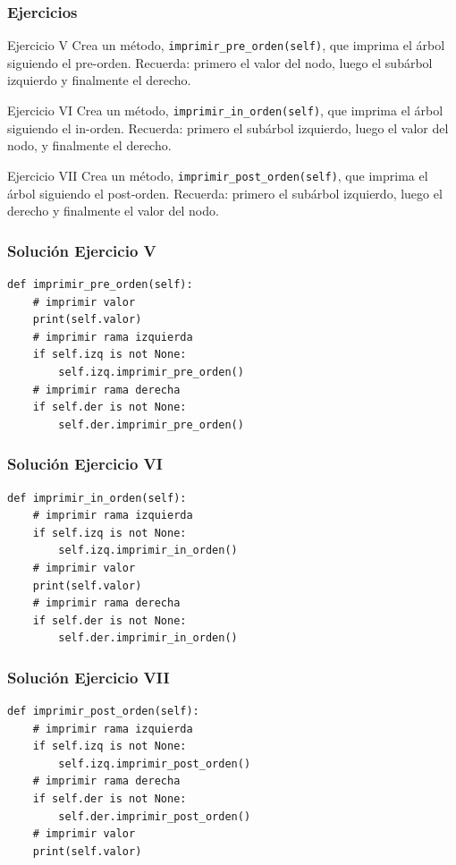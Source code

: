 \documentclass[11pt]{beamer}
\begin{document}
	\begin{frame}\frametitle{Ejercicios}
	\begin{block}{Ejercicio V}
	Crea un método, \lstinline|imprimir_pre_orden(self)|, que imprima el árbol siguiendo el pre-orden. Recuerda: primero el valor del nodo, luego el subárbol izquierdo y finalmente el derecho.
	\end{block}
	\begin{block}{Ejercicio VI}
	Crea un método, \lstinline|imprimir_in_orden(self)|, que imprima el árbol siguiendo el in-orden. Recuerda: primero el subárbol izquierdo, luego el valor del nodo, y finalmente el derecho.
	\end{block}
	\begin{block}{Ejercicio VII}
	Crea un método, \lstinline|imprimir_post_orden(self)|, que imprima el árbol siguiendo el post-orden. Recuerda: primero el subárbol izquierdo, luego el derecho y finalmente el valor del nodo.
	\end{block}
	\end{frame}

	\begin{frame}[fragile]\frametitle{Solución Ejercicio V}
	\begin{lstlisting}
def imprimir_pre_orden(self):
    # imprimir valor
    print(self.valor)
    # imprimir rama izquierda
    if self.izq is not None:
        self.izq.imprimir_pre_orden()
    # imprimir rama derecha
    if self.der is not None:
        self.der.imprimir_pre_orden()
\end{lstlisting}
	\end{frame}

	\begin{frame}[fragile]\frametitle{Solución Ejercicio VI}
	\begin{lstlisting}
def imprimir_in_orden(self):
    # imprimir rama izquierda
    if self.izq is not None:
        self.izq.imprimir_in_orden()
    # imprimir valor
    print(self.valor)
    # imprimir rama derecha
    if self.der is not None:
        self.der.imprimir_in_orden()
\end{lstlisting}
	\end{frame}

	\begin{frame}[fragile]\frametitle{Solución Ejercicio VII}
	\begin{lstlisting}
def imprimir_post_orden(self):
    # imprimir rama izquierda
    if self.izq is not None:
        self.izq.imprimir_post_orden()
    # imprimir rama derecha
    if self.der is not None:
        self.der.imprimir_post_orden()
    # imprimir valor
    print(self.valor)
\end{lstlisting}
	\end{frame}
\end{document}
